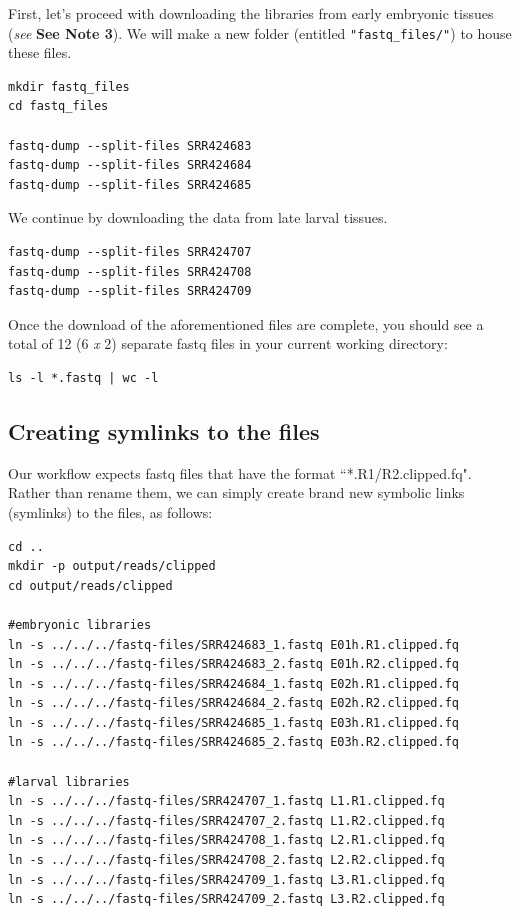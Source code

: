 \documentclass[runningheads,a4paper]{llncs}
\begin{document}
\begin{linenumbers}
\noindent
First, let's proceed with downloading the libraries from early embryonic tissues (\textit{see} \textbf{See Note 3}).
We will make a new folder (entitled \texttt{"fastq\_files/"}) to house these files.

\noindent
\begin{verbatim}
mkdir fastq_files
cd fastq_files

fastq-dump --split-files SRR424683
fastq-dump --split-files SRR424684
fastq-dump --split-files SRR424685
\end{verbatim}

\noindent
We continue by downloading the data from late larval tissues.

\begin{verbatim}
fastq-dump --split-files SRR424707
fastq-dump --split-files SRR424708
fastq-dump --split-files SRR424709
\end{verbatim}

\noindent
Once the download of the aforementioned files are complete, you should see a total of 12 (6 \textit{x} 2) separate fastq files in your current working directory:

\noindent
\begin{verbatim}
ls -l *.fastq | wc -l
\end{verbatim}

\subsection{Creating symlinks to the files}
Our workflow expects fastq files that have the format ``*.R1/R2.clipped.fq". 
Rather than rename them, we can simply create brand new symbolic links (symlinks) to the files, as follows:

\noindent
\begin{verbatim}
cd ..
mkdir -p output/reads/clipped
cd output/reads/clipped

#embryonic libraries
ln -s ../../../fastq-files/SRR424683_1.fastq E01h.R1.clipped.fq 
ln -s ../../../fastq-files/SRR424683_2.fastq E01h.R2.clipped.fq
ln -s ../../../fastq-files/SRR424684_1.fastq E02h.R1.clipped.fq
ln -s ../../../fastq-files/SRR424684_2.fastq E02h.R2.clipped.fq
ln -s ../../../fastq-files/SRR424685_1.fastq E03h.R1.clipped.fq
ln -s ../../../fastq-files/SRR424685_2.fastq E03h.R2.clipped.fq

#larval libraries
ln -s ../../../fastq-files/SRR424707_1.fastq L1.R1.clipped.fq 
ln -s ../../../fastq-files/SRR424707_2.fastq L1.R2.clipped.fq
ln -s ../../../fastq-files/SRR424708_1.fastq L2.R1.clipped.fq
ln -s ../../../fastq-files/SRR424708_2.fastq L2.R2.clipped.fq
ln -s ../../../fastq-files/SRR424709_1.fastq L3.R1.clipped.fq
ln -s ../../../fastq-files/SRR424709_2.fastq L3.R2.clipped.fq


\end{verbatim}
\end{linenumbers}
\end{document}
